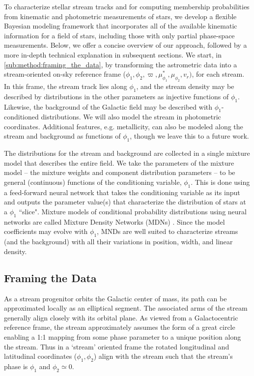 \documentclass[twocolumn]{aastex631}
\newcommand{\parallax}{\varpi}
\begin{document}
    To characterize stellar stream tracks and for computing membership
    probabilities from kinematic and photometric measurements of stars, we
    develop a flexible Bayesian modeling framework that incorporates all of the
    available kinematic information for a field of stars, including those with
    only partial phase-space measurements. Below, we offer a concise overview of
    our approach, followed by a more in-depth technical explanation in
    subsequent sections.  We start, in \autoref{sub:method:framing_the_data}, by
    transforming the astrometric data into a stream-oriented on-sky reference
    frame ($\phi_1, \phi_2, \parallax, \mu_{\phi_1}^*, \mu_{\phi_2}, v_r)$, for
    each stream. In this frame, the stream track lies along $\phi_1$, and the
    stream density may be described by distributions in the other parameters as
    injective functions of $\phi_1$.  Likewise, the background of the Galactic
    field may be described with $\phi_1$-conditioned distributions.  We will
    also model the stream in photometric coordinates. Additional features, e.g.
    metallicity, can also be modeled along the stream and background as
    functions of $\phi_1$, though we leave this to a future work.

    The distributions for the stream and background are collected in a single
    mixture model that describes the entire field.  We take the parameters of
    the mixture model -- the mixture weights and component distribution
    parameters -- to be general (continuous) functions of the conditioning
    variable, $\phi_1$. This is done using a feed-forward neural network that
    takes the conditioning variable as its input and outputs the parameter
    value(s) that characterize the distribution of stars at a $\phi_1$ ``slice".
    Mixture models of conditional probability distributions using neural
    networks are called Mixture Density Networks (MDNs) \citep{Bishop+1994}.
    Since the model coefficients may evolve with $\phi_1$, MNDs are well suited
    to characterize streams (and the background) with all their variations in
    position, width, and linear density.



    \subsection{Framing the Data} \label{sub:method:framing_the_data}

        As a stream progenitor orbits the Galactic center of mass, its path can
        be approximated locally as an elliptical segment. The associated arms of
        the stream generally align closely with its orbital plane.  As viewed
        from a Galactocentric reference frame, the stream approximately assumes
        the form of a great circle enabling a 1:1 mapping from some phase
        parameter to a unique position along the stream. Thus in a `stream'
        oriented frame the rotated longitudinal and latitudinal coordinates
        ($\phi_1, \phi_2$) align with the stream such that the stream's phase is
        $\phi_1$ and $\phi_2 \simeq 0$.
\end{document}
